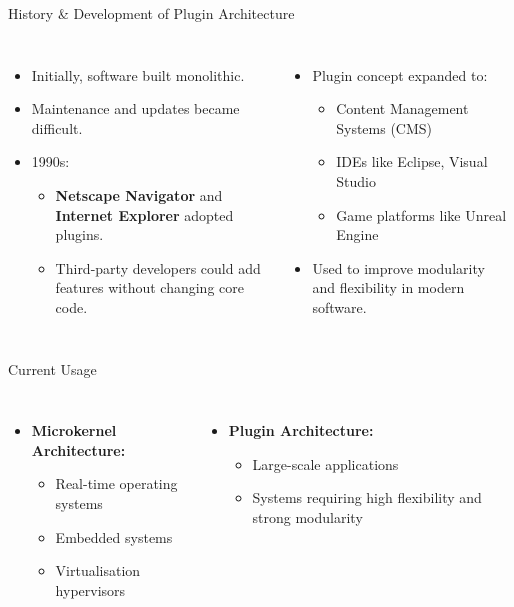 \documentclass[aspectratio=169, table]{beamer}
\begin{document}
\begin{frame}{History \& Development of Plugin Architecture}
\begin{columns}
\begin{itemize}
	\item Initially, software built monolithic.
	\item Maintenance and updates became difficult.
	\item 1990s:
	\begin{itemize}
		\item \textbf{Netscape Navigator} and \textbf{Internet Explorer} adopted plugins.
		\item Third-party developers could add features without changing core code.
	\end{itemize}
\end{itemize}

\begin{itemize}
	\item Plugin concept expanded to:
	\begin{itemize}
		\item Content Management Systems (CMS)
		\item IDEs like Eclipse, Visual Studio
		\item Game platforms like Unreal Engine
	\end{itemize}
	\item Used to improve modularity and flexibility in modern software.
\end{itemize}
\end{columns}
\end{frame}

\begin{frame}{Current Usage}
\begin{columns}
\begin{itemize}
	\item \textbf{Microkernel Architecture:}
	\begin{itemize}
		\item Real-time operating systems
		\item Embedded systems
		\item Virtualisation hypervisors
	\end{itemize}
\end{itemize}

\begin{itemize}
	\item \textbf{Plugin Architecture:}
	\begin{itemize}
		\item Large-scale applications
		\item Systems requiring high flexibility and strong modularity
	\end{itemize}
\end{itemize}
\end{columns}
\end{frame}
\end{document}
